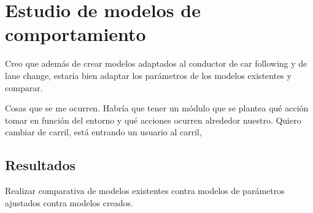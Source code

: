 \chapter{Estudio de modelos de comportamiento}
\label{ch:behavior-models-study}

Creo que además de crear modelos adaptados al conductor de car following y de lane change, estaría bien adaptar los parámetros de los modelos existentes y comparar.

Cosas que se me ocurren. Habría que tener un módulo que se plantea qué acción tomar en función del entorno y qué acciones ocurren alrededor nuestro. Quiero cambiar de carril, está entrando un usuario al carril, 


\section{Resultados}
\label{ch:behavior-models-study:results}

Realizar comparativa de modelos existentes contra modelos de parámetros ajustados contra modelos creados.